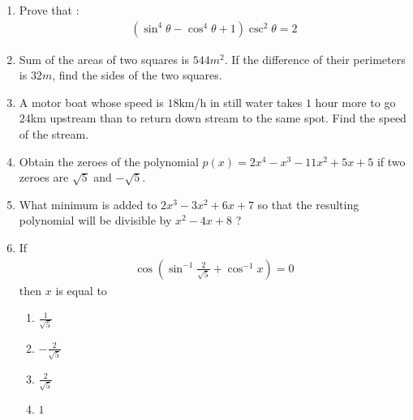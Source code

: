 \documentclass[12pt]{article}
\providecommand{\brak}[1]{\ensuremath{\left(#1\right)}}
\begin{document}
\begin{enumerate}
\item Prove that : 
        \begin{align}
           (\sin^{4}{\theta} - \cos^{4}{\theta} + 1)\csc^{2}{\theta} = 2 
        \end{align}
  
\item
	Sum of the areas of two squares is $544 m^2$. If the difference of their
perimeters is $32 m$, find the sides of the two squares.

\item
	A motor boat whose speed is $18$km/h in still water takes $1$ hour more to 
go $24$km upstream than to return down stream to the same spot. Find the speed of the stream.

\item Obtain the zeroes of the polynomial
$p(x) = 2x^4 - x^3 - 11x^2 + 5x + 5$ if two zeroes are $\sqrt5$ and $-\sqrt5$.

\item What minimum is added to $2x^3 - 3x^2 + 6x + 7$ so that the resulting
polynomial will be divisible by $x^2 - 4x + 8$ ?

\item
If
\begin{align}
\cos\brak{\sin^{-1}{\frac{2}{\sqrt{5}}} + \cos^{-1}{x}} = 0
\end{align}
then $x$ is equal to
\begin{enumerate}[label=(\Alph*)]
	\item $\frac{1}{\sqrt{5}}$
	\item $-\frac{2}{\sqrt{5}}$
	\item $\frac{2}{\sqrt{5}}$
        \item $1$
\end{enumerate}
\end{enumerate}

	
\end{document}
